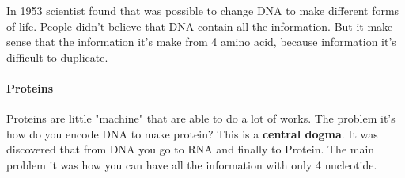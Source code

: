 In 1953 scientist found that was possible to change DNA to make different forms
of life. People didn't believe that DNA contain all the information.
But it make sense that the information it's make from 4 amino acid, because
information it's difficult to duplicate.

\paragraph*{Proteins} Proteins are little "machine" that are able to do a lot
of works. The problem it's how do you encode DNA to make protein? This is a
\textbf{central dogma}. It was discovered that from DNA you go to RNA and
finally to Protein.
The main problem it was how you can have all the information with only
4 nucleotide.
